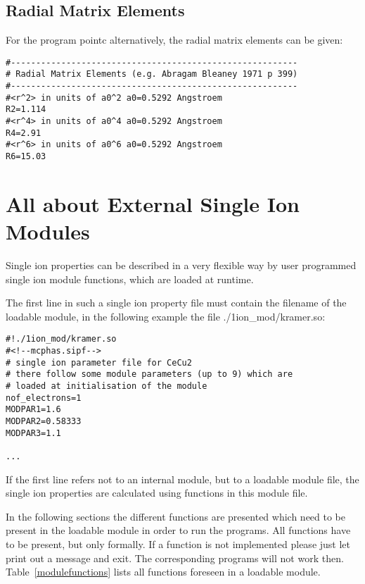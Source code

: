 \subsection{Radial Matrix Elements}

For the program {\prg pointc} alternatively, the radial matrix elements can be given:
{\footnotesize
\begin{verbatim}
#---------------------------------------------------------
# Radial Matrix Elements (e.g. Abragam Bleaney 1971 p 399)
#---------------------------------------------------------
#<r^2> in units of a0^2 a0=0.5292 Angstroem
R2=1.114
#<r^4> in units of a0^4 a0=0.5292 Angstroem
R4=2.91
#<r^6> in units of a0^6 a0=0.5292 Angstroem
R6=15.03
\end{verbatim}
}



\section{All about External Single Ion Modules}\label{extsimod}

Single ion properties can be described in a very flexible way by
user programmed single ion module functions, which are loaded at runtime.

The first line in such a single ion property file
must contain the filename of the loadable module, in the following example
the file {\prg ./1ion\_mod/kramer.so}:

\begin{verbatim}
#!./1ion_mod/kramer.so
#<!--mcphas.sipf-->
# single ion parameter file for CeCu2
# there follow some module parameters (up to 9) which are 
# loaded at initialisation of the module
nof_electrons=1
MODPAR1=1.6
MODPAR2=0.58333
MODPAR3=1.1

...
\end{verbatim}


If the first line refers not to an internal module, but to
 a loadable module file, the single ion
properties are calculated using functions in this module file.

In the following sections the different functions are presented
which need to be present in the loadable module in order to 
run the programs. All functions have to be present, but only 
formally. If a function is not implemented please just let
print out a message and exit. The corresponding programs
will not work then. Table~\ref{modulefunctions} lists all
functions foreseen in a loadable module.

